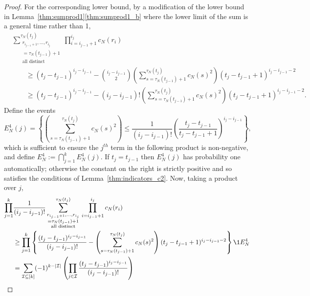 \begin{proof}
For the corresponding lower bound, by a modification of the lower bound in Lemma~\ref{thm:sumprod1}\ref{thm:sumprod1_b} where the lower limit of the sum is a general time rather than 1,
\begin{align*}
&\sum_{\substack{ r_{i_{j-1}+1}, \ldots, r_{i_j} \\ = \tau_N(t_{j-1})+1 
        \\ \text{all distinct} }}^{\tau_N(t_j)}  
        \prod_{i=i_{j-1}+1}^{i_j} c_N(r_i) \\
&\qquad\geq (t_j - t_{j-1})^{i_j - i_{j-1}}
        - \binom{i_j - i_{j-1}}{2} \left( \sum_{s=\tau_N(t_{j-1})+1}^{\tau_N(t_j)}        
        c_N(s)^2 \right) ( t_j - t_{j-1} +1 )^{i_j - i_{j-1} -2} \\
&\qquad\geq (t_j - t_{j-1})^{i_j - i_{j-1}}
        - (i_j - i_{j-1})! \left( \sum_{s=\tau_N(t_{j-1})+1}^{\tau_N(t_j)}
        c_N(s)^2 \right) ( t_j - t_{j-1} +1 )^{i_j - i_{j-1} -2} .
\end{align*}
Define the events
\begin{equation*}
E_N^4(j)
= \left\{ \left( \sum_{s=\tau_N(t_{j-1})+1}^{\tau_N(t_j)} c_N(s)^2 \right)
        \leq \frac{1}{(i_j - i_{j-1}) !}  \left( \frac{ t_j - t_{j-1} }{ t_j - t_{j-1} +1 }
        \right)^{i_j - i_{j-1}} \right\} ,
\end{equation*}
which is sufficient to ensure the $j^{th}$ term in the following product is non-negative,
and define 
$E_N^4 := \bigcap_{j=1}^k E_N^4(j)$.
If $t_j = t_{j-1}$ then $E_N^4(j)$ has probability one automatically; otherwise the constant on the right is strictly positive and so satisfies the conditions of Lemma~\ref{thm:indicators_c2}.
Now, taking a product over $j$, 
\begin{align*}
\prod_{j=1}^k &\frac{1}{(i_j - i_{j-1})!}
        \sum_{\substack{ r_{i_{j-1}+1}, \ldots, r_{i_j} \\ = \tau_N(t_{j-1})+1 
        \\ \text{all distinct} }}^{\tau_N(t_j)} 
        \,\prod_{i=i_{j-1}+1}^{i_j} c_N(r_i) \\
&\geq \prod_{j=1}^k \left\{ \frac{(t_j - t_{j-1})^{i_j - i_{j-1}}}{(i_j - i_{j-1})!}  
        - \left( \sum_{s=\tau_N(t_{j-1})+1}^{\tau_N(t_j)} c_N(s)^2 \right)
        ( t_j - t_{j-1} +1 )^{i_j - i_{j-1} -2} \right\} \1{E_N^4} \\
&= \sum_{\mathcal{I} \subseteq [k]} (-1)^{k-|\mathcal{I}|} 
        \left( \prod_{j\in\mathcal{I}} \frac{(t_j - t_{j-1})^{i_j - i_{j-1}}}
        {(i_j - i_{j-1})!} \right) \\

\end{align*}
\end{proof}
